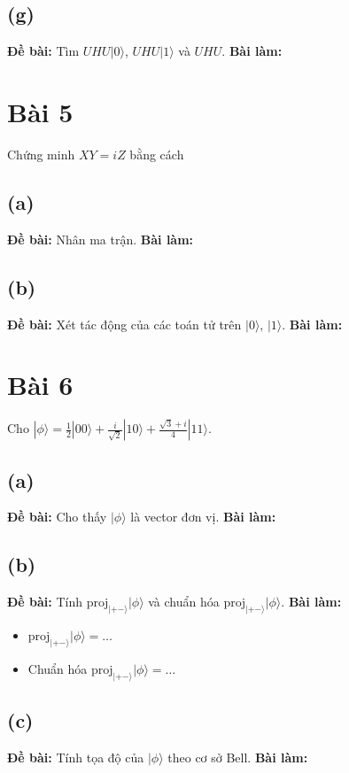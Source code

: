\subsection{(g)}
\textbf{Đề bài:} Tìm $UHU|0\rangle$, $UHU|1\rangle$ và $UHU$.
\textbf{Bài làm:}

\section{Bài 5}
Chứng minh $XY=iZ$ bằng cách

\subsection{(a)}
\textbf{Đề bài:} Nhân ma trận.
\textbf{Bài làm:}

\subsection{(b)}
\textbf{Đề bài:} Xét tác động của các toán tử trên $|0\rangle$, $|1\rangle$.
\textbf{Bài làm:}

\section{Bài 6}
Cho $|\phi\rangle=\frac{1}{2}|00\rangle+\frac{i}{\sqrt{2}}|10\rangle+\frac{\sqrt{3}+i}{4}|11\rangle$.

\subsection{(a)}
\textbf{Đề bài:} Cho thấy $|\phi\rangle$ là vector đơn vị.
\textbf{Bài làm:}

\subsection{(b)}
\textbf{Đề bài:} Tính $\mathrm{proj}_{|+-\rangle}|\phi\rangle$ và chuẩn hóa $\mathrm{proj}_{|+-\rangle}|\phi\rangle$.
\textbf{Bài làm:}
\begin{itemize}
    \item $\mathrm{proj}_{|+-\rangle}|\phi\rangle = \dots$
    \item Chuẩn hóa $\mathrm{proj}_{|+-\rangle}|\phi\rangle = \dots$
\end{itemize}

\subsection{(c)}
\textbf{Đề bài:} Tính tọa độ của $|\phi\rangle$ theo cơ sở Bell.
\textbf{Bài làm:}

